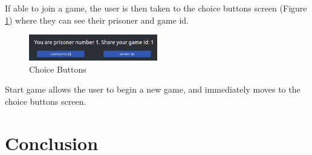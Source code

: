 \documentclass[12pt]{article}
\begin{document}
If able to join a game, the user is then taken to the choice buttons screen (Figure \ref{fig:makechoice}) where they can see their prisoner and game id.

\begin{figure}[!ht]
        \centering
        \includegraphics[width=0.5\textwidth]{images/makechoice} %
        \caption{Choice Buttons}
        \label{fig:makechoice}
\end{figure}

Start game allows the user to begin a new game, and immediately moves to the choice buttons screen. 


\part*{Conclusion}



\end{document}
